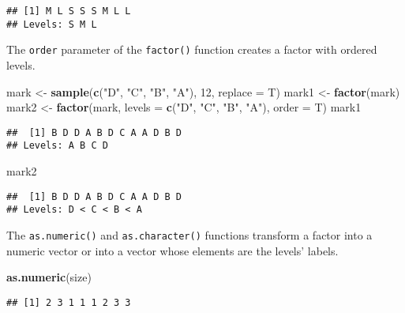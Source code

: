 \documentclass[]{book}
\newenvironment{Shaded}{\begin{snugshade}}{\end{snugshade}}
\newcommand{\KeywordTok}[1]{\textcolor[rgb]{0.13,0.29,0.53}{\textbf{{#1}}}}
\newcommand{\DataTypeTok}[1]{\textcolor[rgb]{0.13,0.29,0.53}{{#1}}}
\newcommand{\DecValTok}[1]{\textcolor[rgb]{0.00,0.00,0.81}{{#1}}}
\newcommand{\StringTok}[1]{\textcolor[rgb]{0.31,0.60,0.02}{{#1}}}
\newcommand{\NormalTok}[1]{{#1}}
\begin{document}
\begin{verbatim}
## [1] M L S S S M L L
## Levels: S M L
\end{verbatim}

The \texttt{order} parameter of the \texttt{factor()} function creates a
factor with ordered levels.

\begin{Shaded}
\begin{Highlighting}[]
\NormalTok{mark <-}\StringTok{ }\KeywordTok{sample}\NormalTok{(}\KeywordTok{c}\NormalTok{(}\StringTok{"D"}\NormalTok{, }\StringTok{"C"}\NormalTok{, }\StringTok{"B"}\NormalTok{, }\StringTok{"A"}\NormalTok{), }\DecValTok{12}\NormalTok{, }\DataTypeTok{replace =} \NormalTok{T)}
\NormalTok{mark1 <-}\StringTok{ }\KeywordTok{factor}\NormalTok{(mark)}
\NormalTok{mark2 <-}\StringTok{ }\KeywordTok{factor}\NormalTok{(mark, }\DataTypeTok{levels =} \KeywordTok{c}\NormalTok{(}\StringTok{"D"}\NormalTok{, }\StringTok{"C"}\NormalTok{, }\StringTok{"B"}\NormalTok{, }\StringTok{"A"}\NormalTok{), }\DataTypeTok{order =} \NormalTok{T)}
\NormalTok{mark1}
\end{Highlighting}
\end{Shaded}

\begin{verbatim}
##  [1] B D D A B D C A A D B D
## Levels: A B C D
\end{verbatim}

\begin{Shaded}
\begin{Highlighting}[]
\NormalTok{mark2}
\end{Highlighting}
\end{Shaded}

\begin{verbatim}
##  [1] B D D A B D C A A D B D
## Levels: D < C < B < A
\end{verbatim}

The \texttt{as.numeric()} and \texttt{as.character()} functions
transform a factor into a numeric vector or into a vector whose elements
are the levels' labels.

\begin{Shaded}
\begin{Highlighting}[]
\KeywordTok{as.numeric}\NormalTok{(size)}
\end{Highlighting}
\end{Shaded}

\begin{verbatim}
## [1] 2 3 1 1 1 2 3 3
\end{verbatim}
\end{document}

